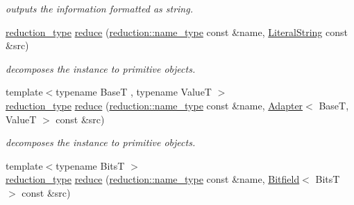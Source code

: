 \begin{DoxyCompactItemize}
\begin{DoxyCompactList}\small\item\em outputs the information formatted as string. \end{DoxyCompactList}\item 
\hypertarget{namespacehryky_aed9750ebeae5b812d73222d3776c7234}{\hyperlink{namespacehryky_a343a9a4c36a586be5c2693156200eadc}{reduction\-\_\-type} \hyperlink{namespacehryky_aed9750ebeae5b812d73222d3776c7234}{reduce} (\hyperlink{namespacehryky_1_1reduction_ac686c30a4c8d196bbd0f05629a6b921f}{reduction\-::name\-\_\-type} const \&name, \hyperlink{classhryky_1_1_literal_string}{Literal\-String} const \&src)}\label{namespacehryky_aed9750ebeae5b812d73222d3776c7234}

\begin{DoxyCompactList}\small\item\em decomposes the instance to primitive objects. \end{DoxyCompactList}\item 
\hypertarget{namespacehryky_abd67caf2c272d1836150c8c4974147f1}{{\footnotesize template$<$typename Base\-T , typename Value\-T $>$ }\\\hyperlink{namespacehryky_a343a9a4c36a586be5c2693156200eadc}{reduction\-\_\-type} \hyperlink{namespacehryky_abd67caf2c272d1836150c8c4974147f1}{reduce} (\hyperlink{namespacehryky_1_1reduction_ac686c30a4c8d196bbd0f05629a6b921f}{reduction\-::name\-\_\-type} const \&name, \hyperlink{classhryky_1_1_adapter}{Adapter}$<$ Base\-T, Value\-T $>$ const \&src)}\label{namespacehryky_abd67caf2c272d1836150c8c4974147f1}

\begin{DoxyCompactList}\small\item\em decomposes the instance to primitive objects. \end{DoxyCompactList}\item 
\hypertarget{namespacehryky_a508b9129a4c0e791849603a3ed4c5f32}{{\footnotesize template$<$typename Bits\-T $>$ }\\\hyperlink{namespacehryky_a343a9a4c36a586be5c2693156200eadc}{reduction\-\_\-type} \hyperlink{namespacehryky_a508b9129a4c0e791849603a3ed4c5f32}{reduce} (\hyperlink{namespacehryky_1_1reduction_ac686c30a4c8d196bbd0f05629a6b921f}{reduction\-::name\-\_\-type} const \&name, \hyperlink{classhryky_1_1_bitfield}{Bitfield}$<$ Bits\-T $>$ const \&src)}\label{namespacehryky_a508b9129a4c0e791849603a3ed4c5f32}


\end{DoxyCompactItemize}
